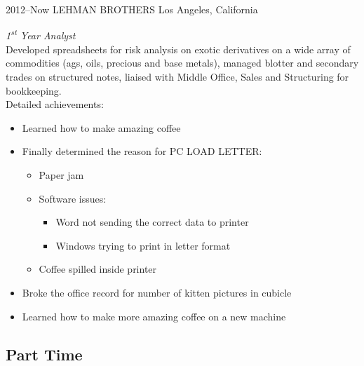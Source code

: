 \documentclass[]{devkhan-cv} %
\begin{document}
\begin{entrylist}


\entry
{2012--Now}
{LEHMAN BROTHERS}
{Los Angeles, California}
{\emph{1\textsuperscript{st} Year Analyst} \\
Developed spreadsheets for risk analysis on exotic derivatives on a wide array of commodities (ags, oils, precious and base metals), managed blotter and secondary trades on structured notes, liaised with Middle Office, Sales and Structuring for bookkeeping. \\
Detailed achievements:
\begin{itemize}
\item Learned how to make amazing coffee
\item Finally determined the reason for \textsc{PC LOAD LETTER}:
\begin{itemize}
\item Paper jam
\item Software issues:
\begin{itemize}
\item Word not sending the correct data to printer
\item Windows trying to print in letter format
\end{itemize}
\item Coffee spilled inside printer
\end{itemize}
\item Broke the office record for number of kitten pictures in cubicle
\item Learned how to make more amazing coffee on a new machine
\end{itemize}}


\end{entrylist}

\subsection{Part Time}
\end{document}
